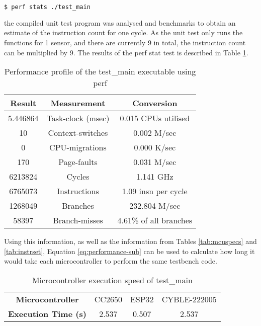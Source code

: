 \documentclass[12pt, titlepage]{article}
\begin{document}
\enspace

\begin{lstlisting}[language=bash]
  $ perf stats ./test_main
\end{lstlisting}

the compiled unit test program was analysed and benchmarks to obtain an estimate of the instruction count for one cycle. As the unit test only runs the functions for 1 sensor, and there are currently 9 in total, the instruction count can be multiplied by 9. The results of the perf stat test is described in Table \ref{tab:perf}.

\begin{table}[h!]
    \centering
    \begin{tabular}{| c c c |}
        \hline
        Result & Measurement & Conversion \\
        \hline
        5.446864 & Task-clock (msec) & 0.015 CPUs utilised \\
        10 & Context-switches & 0.002 M/sec \\
        0 & CPU-migrations & 0.000 K/sec \\
        170 & Page-faults & 0.031 M/sec \\
        6213824 & Cycles & 1.141 GHz \\
        6765073 & Instructions & 1.09 insn per cycle \\
        1268049 & Branches & 232.804 M/sec \\
        58397 & Branch-misses & 4.61\% of all branches \\
        \hline
    \end{tabular}
    \caption{Performance profile of the test\_main executable using perf}
    \label{tab:perf}
\end{table}

Using this information, as well as the information from Tables \ref{tab:mcuspecs} and \ref{tab:instrset}, Equation \ref{eq:performance-sub} can be used to calculate how long it would take each microcontroller to perform the same testbench code.

\begin{table}[h!]
    \centering
    \begin{tabular}{| c | c c c |}
        \hline
        \bfseries Microcontroller
        & CC2650 & ESP32 & CYBLE-222005 \\
        \bfseries Execution Time (s)
        & 2.537 & 0.507 & 2.537 \\
        \hline
    \end{tabular}
    \caption{Microcontroller execution speed of test\_main}
    \label{tab:perf-cpu}
\end{table}
\end{document}
